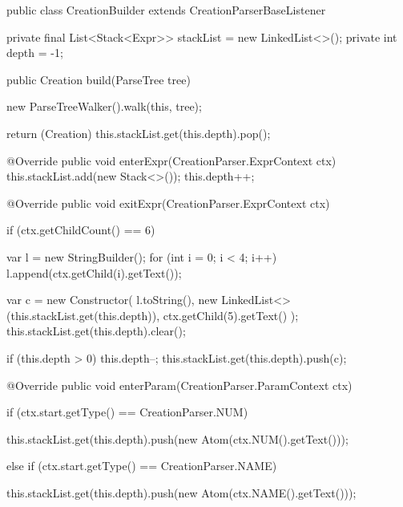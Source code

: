 \begin{code}[language=java, caption={Builder-Klasse für den AST}, label={lst:Aufgabe2b_Builder}]
public class CreationBuilder extends CreationParserBaseListener {

    private final List<Stack<Expr>> stackList = new LinkedList<>();
    private int depth = -1;

    public Creation build(ParseTree tree) {
        new ParseTreeWalker().walk(this, tree);

        return (Creation) this.stackList.get(this.depth).pop();
    }

    @Override
    public void enterExpr(CreationParser.ExprContext ctx) {
        this.stackList.add(new Stack<>());
        this.depth++;
    }

    @Override
    public void exitExpr(CreationParser.ExprContext ctx) {
        if (ctx.getChildCount() == 6) {
            var l = new StringBuilder();
            for (int i = 0; i < 4; i++) {
                l.append(ctx.getChild(i).getText());
            }


            var c = new Constructor(
                    l.toString(),
                    new LinkedList<>(this.stackList.get(this.depth)),
                    ctx.getChild(5).getText()
            );
            this.stackList.get(this.depth).clear();

            if (this.depth > 0)
                this.depth--;
            this.stackList.get(this.depth).push(c);

        }
    }

    @Override
    public void enterParam(CreationParser.ParamContext ctx) {
        if (ctx.start.getType() == CreationParser.NUM) {

            this.stackList.get(this.depth).push(new Atom(ctx.NUM().getText()));

        } else if (ctx.start.getType() == CreationParser.NAME) {

            this.stackList.get(this.depth).push(new Atom(ctx.NAME().getText()));

        }
    }

}
\end{code}

